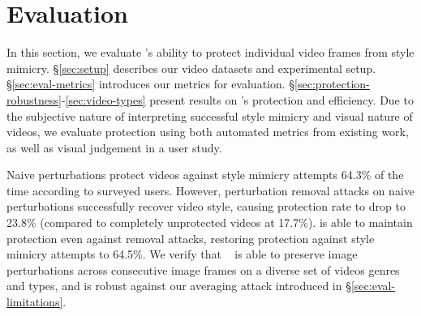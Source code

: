 \secspace
\section{Evaluation} 
\label{sec:eval}
In this section, we evaluate \system's ability to protect individual video
frames from style mimicry. \S\ref{sec:setup} describes our video
datasets and experimental setup. \S\ref{sec:eval-metrics} introduces
our metrics for evaluation. \S\ref{sec:protection-robustness}-\ref{sec:video-types}
present results on \system's protection and efficiency. Due to the subjective
nature of interpreting successful style mimicry and visual nature of videos,
we evaluate protection using both automated metrics from existing work, as
well as visual judgement in a user study.

Naive perturbations protect videos against style mimicry attempts 64.3\% of
the time according to surveyed users. However, perturbation removal attacks
on naive perturbations successfully recover video style, causing protection
rate to drop to 23.8\% (compared to completely unprotected videos at
17.7\%). \system{} is able to maintain protection even against removal
attacks, restoring protection against style mimicry attempts to 64.5\%. 
We verify that \system~ is able to preserve image perturbations across
consecutive image frames on a diverse set of videos genres and types, and is
robust against our averaging attack introduced in \S\ref{sec:eval-limitations}. 

